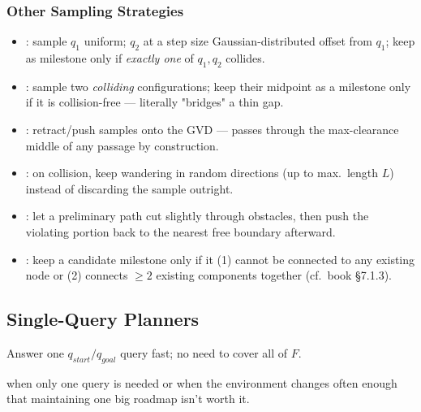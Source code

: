 
\subsubsection{Other Sampling Strategies}
\begin{itemize}
\item {}: sample $q_1$ uniform; $q_2$ at a step size Gaussian-distributed offset from $q_1$; keep as milestone only if \emph{exactly one} of $q_1,q_2$ collides.
\item {}: sample two \emph{colliding} configurations; keep their midpoint as a milestone only if it is collision-free — literally "bridges" a thin gap.
\item {}: retract/push samples onto the GVD — passes through the max-clearance middle of any passage by construction.
\item {}: on collision, keep wandering in random directions (up to max.\ length $L$) instead of discarding the sample outright.
\item {}: let a preliminary path cut slightly through obstacles, then push the violating portion back to the nearest free boundary afterward.
\item {}: keep a candidate milestone only if it (1) cannot be connected to any existing node or (2) connects $\ge2$ existing components together (cf.\ book \S7.1.3).
\end{itemize}

\begin{democallout}
\end{democallout}

\subsection{Single-Query Planners}
Answer one $q_{start}/q_{goal}$ query fast; no need to cover all of $F$.
\begin{notebox}
 when only one query is needed or when the environment changes often enough that maintaining one big roadmap isn't worth it.
\end{notebox}

